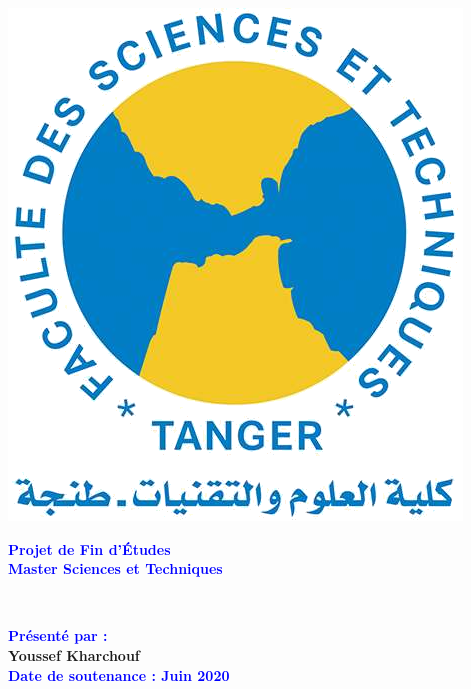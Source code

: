 \begin{titlepage}
\begin{minipage}{0.5\textwidth}
\end{minipage}
\hfill
\begin{minipage}{0.17\textwidth}
  \includegraphics[width=\linewidth]{resources/fstt.png}
\end{minipage}

\vspace*{1.5cm}

\centering

\textbf{\textcolor{blue}{Projet de Fin d’Études}}\\[0.3cm]
\textbf{\textcolor{blue}{Master Sciences et Techniques}}\\[0.5cm]
\colorbox{gray!50}{\strut{}}\\[2cm]


\vspace{1cm}
\begin{center}
\textbf{\textcolor{blue}{Présenté par :}}\\[0.5cm]
\textbf{Youssef Kharchouf}\\[0.5cm]
\textbf{\textcolor{blue}{Date de soutenance : Juin 2020}}
\end{center}
  

\end{titlepage}
